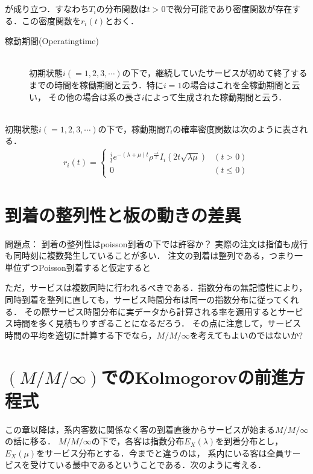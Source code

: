 \documentclass[a4j,papersize,disablejfam,slide,14pt]{jsarticle}
\def\exp#1{e^{#1}} %
\begin{document}
    が成り立つ．すなわち$T_i$の分布関数は$t>0$で微分可能であり密度関数が存在する．この密度関数を$r_i(t)$とおく．
    \begin{screen}
    	\begin{description}
        	\item[稼動期間{\rm (Operating\quad time)}]\mbox{}\\
            	初期状態$i (= 1,2,3,\cdots)$の下で，継続していたサービスが初めて終了するまでの時間を稼働期間と云う．特に$i=1$の場合はこれを全稼動期間と云い，
                その他の場合は系の長さ$i$によって生成された稼動期間と云う．
        \end{description}
        \mbox{}\\
    	初期状態$i (= 1,2,3,\cdots)$の下で，稼動期間$T_i$の確率密度関数は次のように表される．
    	\begin{align}
        	r_i(t) =
            \begin{cases}	
            	\frac{i}{t} \exp{-(\lambda + \mu)t} \rho^{\frac{-i}{2}} I_{i}(2t\sqrt{\lambda \mu}) & (t > 0) \\
                0 & (t \leq 0)
            \end{cases}
        \end{align}
    \end{screen}

\section{到着の整列性と板の動きの差異}
	問題点：
	到着の整列性はpoisson到着の下では許容か？
    実際の注文は指値も成行も同時刻に複数発生していることが多い．
    注文の到着は整列である，つまり一単位ずつ{\rm Poisson}到着すると仮定すると
    
    ただ，サービスは複数同時に行われるべきである．指数分布の無記憶性により，
    同時到着を整列に直しても，サービス時間分布は同一の指数分布に従ってくれる．
    その際サービス時間分布に実データから計算される率を適用するとサービス時間を多く見積もりすぎることになるだろう．
    その点に注意して，サービス時間の平均を適切に計算する下でなら，$M/M/\infty$を考えてもよいのではないか?

\section{$(M/M/\infty)$での{\rm Kolmogorov}の前進方程式}
	この章以降は，系内客数に関係なく客の到着直後からサービスが始まる$M/M/\infty$の話に移る．
    $M/M/\infty$の下で，各客は指数分布$E_X(\lambda)$を到着分布とし，$E_X(\mu)$をサービス分布とする．今までと違うのは，
    系内にいる客は全員サービスを受けている最中であるということである．次のように考える．\\
    
\end{document}
